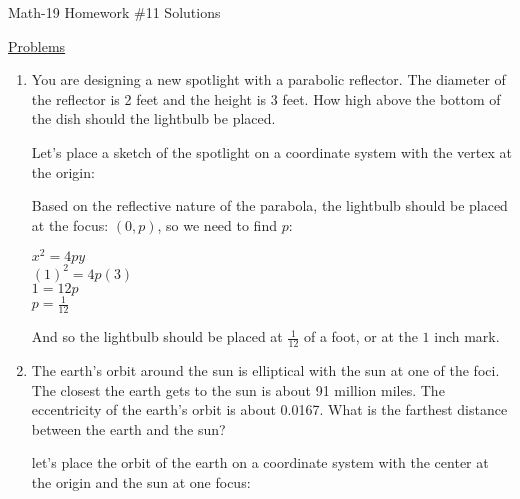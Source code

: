 \documentclass[letterpaper,12pt,fleqn]{article}
\begin{document}
\begin{center}
\Large Math-19 Homework \#11 Solutions
\end{center}

\vspace{0.5in}

\underline{Problems}

\begin{enumerate}
\item You are designing a new spotlight with a parabolic reflector. The
  diameter of the reflector is 2 feet and the height is 3 feet. How high above
  the bottom of the dish should the lightbulb be placed.

  Let's place a sketch of the spotlight on a coordinate system with the vertex
  at the origin:


  Based on the reflective nature of the parabola, the lightbulb should be
  placed at the focus: $(0,p)$, so we need to find $p$:

  $x^2=4py$ \\
  $(1)^2=4p(3)$ \\
  $1=12p$ \\
  $p=\frac{1}{12}$

  And so the lightbulb should be placed at $\frac{1}{12}$ of a foot, or at
  the $1$ inch mark.

\item The earth's orbit around the sun is elliptical with the sun at one of
  the foci. The closest the earth gets to the sun is about 91 million miles.
  The eccentricity of the earth's orbit is about 0.0167. What is the farthest
  distance between the earth and the sun?

  let's place the orbit of the earth on a coordinate system with the center at
  the origin and the sun at one focus:



\end{enumerate}
\end{document}
